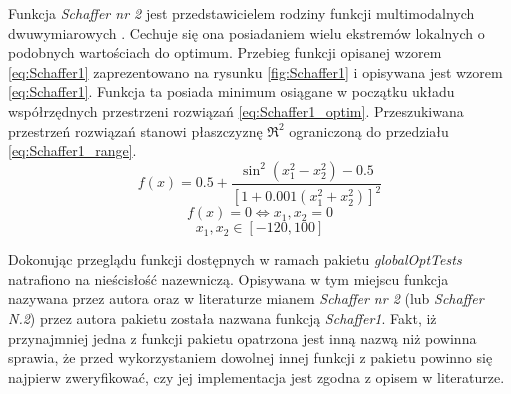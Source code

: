 \par
Funkcja \emph{Schaffer nr 2} jest przedstawicielem rodziny funkcji multimodalnych dwuwymiarowych \cite{schaffer1985some}. Cechuje się ona posiadaniem wielu ekstremów lokalnych o podobnych wartościach do optimum. Przebieg funkcji opisanej wzorem \ref{eq:Schaffer1} zaprezentowano na rysunku \ref{fig:Schaffer1} i opisywana jest wzorem \ref{eq:Schaffer1}. Funkcja ta posiada minimum osiągane w początku układu współrzędnych przestrzeni rozwiązań \ref{eq:Schaffer1_optim}. Przeszukiwana przestrzeń rozwiązań stanowi płaszczyznę $\Re^2$ ograniczoną do przedziału \ref{eq:Schaffer1_range}.
\begin{equation} \label{eq:Schaffer1}
f(x)=0.5+\frac{\sin^2(x_1^2-x_2^2)-0.5}{[1+0.001(x_1^2+x_2^2)]^2}
\end{equation}
\begin{equation} \label{eq:Schaffer1_optim}
f(x)=0 \Leftrightarrow x_1,x_2=0
\end{equation}
\begin{equation} \label{eq:Schaffer1_range}
x_1,x_2\in[-120,100]
\end{equation}
\par
Dokonując przeglądu funkcji dostępnych w ramach pakietu \emph{globalOptTests} natrafiono na nieścisłość nazewniczą. Opisywana w tym miejscu funkcja nazywana przez autora oraz w literaturze mianem \emph{Schaffer nr 2} (lub \emph{Schaffer N.2}) przez autora pakietu została nazwana funkcją \emph{Schaffer1}. Fakt, iż przynajmniej jedna z funkcji pakietu opatrzona jest inną nazwą niż powinna sprawia, że przed wykorzystaniem dowolnej innej funkcji z pakietu powinno się najpierw zweryfikować, czy jej implementacja jest zgodna z opisem w literaturze.

